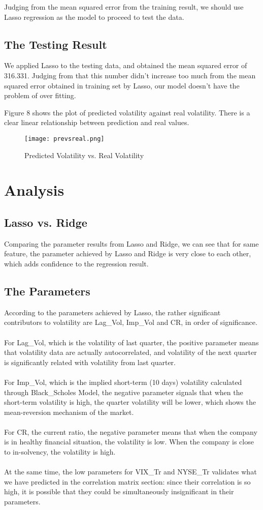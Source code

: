 \documentclass[b4paper]{article}
\begin{document}
Judging from the mean squared error from the training result, we should use Lasso regression as the model to proceed to test the data.

\subsection{The Testing Result}
We applied Lasso to the testing data, and obtained the mean squared error of 316.331. Judging from that this number didn't increase too much from the mean squared error obtained in training set by Lasso, our model doesn't have the problem of over fitting. 

Figure 8 shows the plot of predicted volatility against real volatility. There is a clear linear relationship between prediction and real values.

\begin{figure}[h]
\centering
\texttt{[image: prevsreal.png]}
\caption{\label{fig:scatter plot}Predicted Volatility vs. Real Volatility}
\end{figure}

\section{Analysis}
\subsection{Lasso vs. Ridge}
Comparing the parameter results from Lasso and Ridge, we can see that for same feature, the parameter achieved by Lasso and Ridge is very close to each other, which adds confidence to the regression result.
\subsection{The Parameters}
According to the parameters achieved by Lasso, the rather significant contributors to volatility are Lag\_Vol, Imp\_Vol and CR, in order of significance. 
\\\\For Lag\_Vol, which is the volatility of last quarter, the positive parameter means that volatility data are actually autocorrelated, and volatility of the next quarter is significantly related with volatility from last quarter.
\\\\For Imp\_Vol, which is the implied short-term (10 days) volatility calculated through Black\_Scholes Model, the negative parameter signals that when the short-term volatility is high, the quarter volatility will be lower, which shows the mean-reversion mechanism of the market.
\\\\For CR, the current ratio, the negative parameter means that when the company is in healthy financial situation, the volatility is low. When the company is close to in-solvency, the volatility is high.
\\\\At the same time, the low parameters for VIX\_Tr and NYSE\_Tr validates what we have predicted in the correlation matrix section: since their correlation is so high, it is possible that they could be simultaneously insignificant in their parameters.
\end{document}
